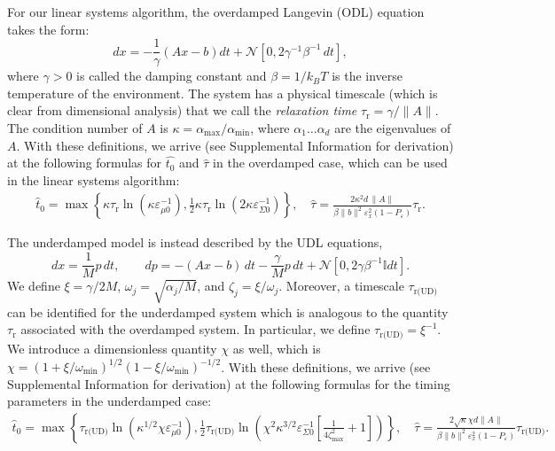 \documentclass[prx,onecolumn,floatfix,longbibliography,notitlepage, nofootinbib]{revtex4-1}
\begin{document}
For our linear systems algorithm, the overdamped Langevin (ODL) equation takes the form:
\begin{equation}
    \label{eq:ODLdynamics_main}
    dx = - \frac{1}{\gamma}(A x - b) dt +\mathcal{N}\left[0,2\gamma^{-1}\beta^{-1}\, dt\right],
\end{equation}
where $\gamma >0$ is called the damping constant and $\beta = 1/k_B T$ is the inverse temperature of the environment. The system has a physical timescale (which is clear from dimensional analysis) that we call the \emph{relaxation time} $\tau_\text{r} = \gamma/\|A\|$. The condition number of $A$ is $\kappa = \alpha_\text{max}/\alpha_\text{min}$, where $\alpha_1\dots\alpha_d$ are the eigenvalues of $A$. With these definitions, we arrive (see Supplemental Information for derivation) at the following formulas for $\widehat{t_0}$ and $\widehat{\tau}$ in the overdamped case, which can be used in the linear systems algorithm:
\begin{align}
\label{eq:t0-tau-linear-systems-odl}
\widehat{t}_0 =
 \max \left\{\kappa \tau_\text{r}\ln \left(\kappa \varepsilon^{-1}_{\mu 0}\right),\frac{1}{2} \kappa \tau_\text{r}\ln\left(2\kappa\varepsilon_{\Sigma 0}^{-1}\right)\right\},\quad
    \widehat{\tau} = \frac{2 \kappa^2 d\, \|A\|  }{\beta \|b\|^2 \varepsilon_x^2 (1-P_\varepsilon)}\tau_\text{r}.
\end{align}


The underdamped model is instead described by the UDL equations,
\begin{equation}
\label{eq:UDL-x}
    dx  = \frac{1}{M} p \, dt, \qquad  dp = -(A x - b) \, dt- \frac{\gamma}{M} p \, dt + \mathcal{N}[0,2 \gamma \beta^{-1}  \mathbb{I} dt].
\end{equation}
We define $\xi = \gamma/2M$, $\omega_j = \sqrt{\alpha_j/M}$, and $\zeta_j = \xi/\omega_j$. Moreover, a timescale $\tau_\text{r(UD)}$ can be identified for the underdamped system which is analogous to the quantity $\tau_\text{r}$ associated with the overdamped system. In particular, we define $\tau_{\text{r(UD)}} = \xi^{-1}$. We introduce a dimensionless quantity $\chi$ as well, which is $\chi = (1+ \xi/\omega_\text{min})^{1/2}(1- \xi/\omega_\text{min})^{-1/2}$.
With these definitions, we arrive (see Supplemental Information for derivation) at the following formulas for the timing parameters in the underdamped case:
\begin{align}
\label{eq:t0-tau-linear-systems-udl}
\widehat{t}_0 =  \max \left\{ \tau_{\text{r(UD)}} \ln \left( \kappa^{1/2}\chi \varepsilon_{\mu 0}^{-1}\right),\frac{1}{2} \tau_\text{r(UD)}\ln\left(\chi^2 \kappa^{3/2}\varepsilon_{\Sigma0}^{-1}\left[\frac{1}{4\zeta_\text{max}^{2}}+1\right]\right)\right\},\quad
    \widehat{\tau} = \frac{2\sqrt{\kappa} \chi d\|A\| }{ \beta \|b\|^2\varepsilon_x^2(1-P_\varepsilon)} \tau_{\text{r(UD)}}.
\end{align}
\end{document}
